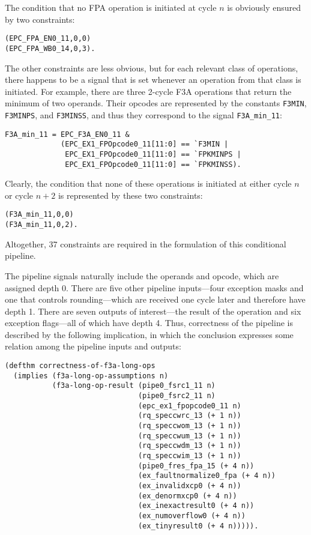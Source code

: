 \documentclass{article}
\begin{document}
The condition that no FPA operation is initiated at cycle $n$ is
obviously ensured by two constraints:

\begin{verbatim}
(EPC_FPA_EN0_11,0,0)
(EPC_FPA_WB0_14,0,3).
\end{verbatim}
The other constraints are less obvious, but for each relevant class of
operations, there happens to be a signal that is set whenever an
operation from that class is initiated.  For example, there are three
2-cycle F3A operations that return the minimum of two operands.  Their
opcodes are represented by the constants {\tt F3MIN}, {\tt F3MINPS},
and {\tt F3MINSS}, and thus they correspond to the signal
\verb!F3A_min_11!:

\begin{verbatim}
F3A_min_11 = EPC_F3A_EN0_11 &
             (EPC_EX1_FPOpcode0_11[11:0] == `F3MIN |
              EPC_EX1_FPOpcode0_11[11:0] == `FPKMINPS | 
              EPC_EX1_FPOpcode0_11[11:0] == `FPKMINSS).
\end{verbatim}
Clearly, the condition that none of these operations is initiated at
either cycle $n$ or cycle $n+2$ is represented by these two
constraints:

\begin{verbatim}
(F3A_min_11,0,0)
(F3A_min_11,0,2).
\end{verbatim}
Altogether, 37 constraints are required in the formulation of this
conditional pipeline.

The pipeline signals naturally include the operands and opcode, which
are assigned depth 0.  There are five other pipeline inputs---four
exception masks and one that controls rounding---which are received
one cycle later and therefore have depth 1.  There are seven outputs of
interest---the result of the operation and six exception flags---all
of which have depth 4.  Thus, correctness of the pipeline is described
by the following implication, in which the conclusion expresses some
relation among the pipeline inputs and outputs:

\begin{verbatim}
(defthm correctness-of-f3a-long-ops
  (implies (f3a-long-op-assumptions n)
           (f3a-long-op-result (pipe0_fsrc1_11 n)
                               (pipe0_fsrc2_11 n)
                               (epc_ex1_fpopcode0_11 n)
                               (rq_speccwrc_13 (+ 1 n))
                               (rq_speccwom_13 (+ 1 n))
                               (rq_speccwum_13 (+ 1 n))
                               (rq_speccwdm_13 (+ 1 n))
                               (rq_speccwim_13 (+ 1 n))
                               (pipe0_fres_fpa_15 (+ 4 n))
                               (ex_faultnormalize0_fpa (+ 4 n))
                               (ex_invalidxcp0 (+ 4 n))
                               (ex_denormxcp0 (+ 4 n))
                               (ex_inexactresult0 (+ 4 n))
                               (ex_numoverflow0 (+ 4 n))
                               (ex_tinyresult0 (+ 4 n))))).
\end{verbatim}
\end{document}
